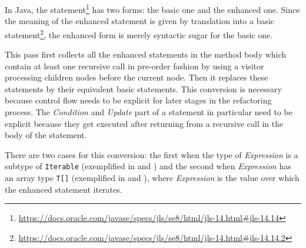 In Java, the  statement\footnote{\url{https://docs.oracle.com/javase/specs/jls/se8/html/jls-14.html#jls-14.14}}
has two forms: the basic one and the enhanced one. Since the meaning of the enhanced  statement is given by
translation into a basic  statement\footnote{\url{https://docs.oracle.com/javase/specs/jls/se8/html/jls-14.html#jls-14.14.2}},
the enhanced form is merely syntactic sugar for the basic one.

This pass first collects all the enhanced  statements in the method body which contain at least one recursive
call in pre-order fashion by using a visitor processing children nodes before the current node. Then it replaces these
statements by their equivalent basic  statements. This conversion is necessary because control flow needs to
be explicit for later stages in the refactoring process. The \textit{Condition} and \textit{Update} part of a 
statement in particular need to be explicit because they get executed after returning from a recursive call in the body
of the  statement.

There are two cases for this conversion: the first when the type of \textit{Expression} is a subtype of
\texttt{Iterable} (exemplified in  and
) and the second when \textit{Expression} has an array type
\texttt{T[]} (exemplified in  and
), where \textit{Expression} is the value over which the
enhanced  statement iterates.

